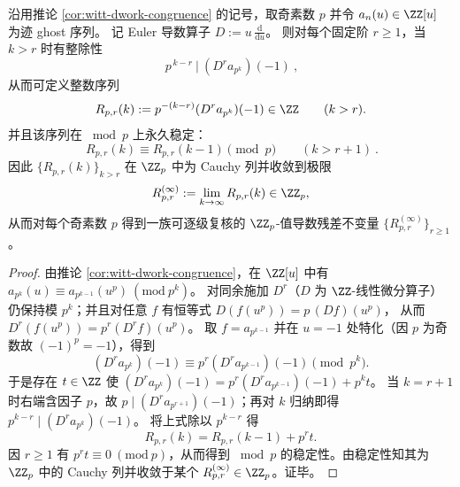 \begin{corollary}[\texorpdfstring{$u=-1$}{u=-1} 处的 \texorpdfstring{$p$}{p}-进导数残差：由 Dwork 同余诱导的 \texorpdfstring{$\ZZ_p$}{Zp}-值指纹族]\label{cor:witt-minus1-padic-derivative-residues}
沿用推论 \ref{cor:witt-dwork-congruence} 的记号，取奇素数 \(p\) 并令 \(a_n(u)\in\ZZ[u]\) 为迹 ghost 序列。
记 Euler 导数算子 \(D:=u\,\frac{\mathrm{d}}{\mathrm{d}u}\)。
则对每个固定阶 \(r\ge 1\)，当 \(k>r\) 时有整除性
\[
\boxed{\ p^{\,k-r}\ \big|\ (D^r a_{p^k})(-1)\ },
\]
从而可定义整数序列
\[
R_{p,r}(k):=p^{-(k-r)}(D^r a_{p^k})(-1)\in\ZZ\qquad(k>r).
\]
并且该序列在 \(\bmod p\) 上永久稳定：
\[
\boxed{\ R_{p,r}(k)\equiv R_{p,r}(k-1)\pmod p\qquad(k>r+1)\ }.
\]
因此 \(\{R_{p,r}(k)\}_{k>r}\) 在 \(\ZZ_p\) 中为 Cauchy 列并收敛到极限
\[
R_{p,r}^{(\infty)}:=\lim_{k\to\infty}R_{p,r}(k)\in\ZZ_p,
\]
从而对每个奇素数 \(p\) 得到一族可逐级复核的 \(\ZZ_p\)-值导数残差不变量 \(\{R_{p,r}^{(\infty)}\}_{r\ge 1}\)。
\end{corollary}
\begin{proof}
由推论 \ref{cor:witt-dwork-congruence}，在 \(\ZZ[u]\) 中有
\(
a_{p^k}(u)\equiv a_{p^{k-1}}(u^p)\ (\mathrm{mod}\ p^k)
\)。
对同余施加 \(D^r\)（\(D\) 为 \(\ZZ\)-线性微分算子）仍保持模 \(p^k\)；并且对任意 \(f\) 有恒等式
\(
D(f(u^p))=p\,(Df)(u^p)
\)，
从而 \(D^r(f(u^p))=p^r(D^rf)(u^p)\)。
取 \(f=a_{p^{k-1}}\) 并在 \(u=-1\) 处特化（因 \(p\) 为奇数故 \((-1)^p=-1\)），得到
\[
(D^ra_{p^k})(-1)\equiv p^r(D^ra_{p^{k-1}})(-1)\pmod{p^k}.
\]
于是存在 \(t\in\ZZ\) 使
\(
(D^ra_{p^k})(-1)=p^r(D^ra_{p^{k-1}})(-1)+p^k t
\)。
当 \(k=r+1\) 时右端含因子 \(p\)，故 \(p\mid (D^ra_{p^{r+1}})(-1)\)；再对 \(k\) 归纳即得 \(p^{k-r}\mid (D^ra_{p^k})(-1)\)。
将上式除以 \(p^{k-r}\) 得
\[
R_{p,r}(k)=R_{p,r}(k-1)+p^r t.
\]
因 \(r\ge 1\) 有 \(p^r t\equiv 0\ (\mathrm{mod}\ p)\)，从而得到 \(\bmod p\) 的稳定性。由稳定性知其为 \(\ZZ_p\) 中的 Cauchy 列并收敛于某个 \(R_{p,r}^{(\infty)}\in\ZZ_p\)。证毕。
\end{proof}
